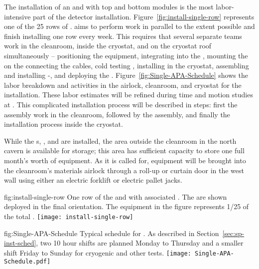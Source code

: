 The installation of an  and   with top and bottom  modules is the most labor-intensive part of the detector installation. Figure~\ref{fig:install-single-row} represents one of the 25 rows of .   aims to perform work in parallel to the extent possible and finish installing one row every week. 
This requires that several separate teams work in the cleanroom, inside the cryostat, and on the cryostat roof simultaneously --  positioning the equipment, integrating  into the , mounting the   on the  connecting the cables, cold testing , installing  in the cryostat, assembling and installing -, and deploying the .
Figure~\ref{fig:Single-APA-Schedule} shows the labor breakdown and activities in the airlock,  cleanroom, and cryostat for the  installation. These labor estimates will be refined during time and motion studies at . 
This complicated installation process will be described in steps: first the  assembly work in the cleanroom, followed by the  assembly, and finally the installation process inside the cryostat.

While the s, , and  are installed, the area outside the cleanroom in the north cavern is available for storage; this area has sufficient capacity to store one full month's worth of equipment. As it is called for, equipment will be brought into the cleanroom's materials airlock through a roll-up or curtain door in the west wall using either an electric forklift or electric pallet jacks.

\begin{dunefigure}{fig:install-single-row}
{One row of the  and  with associated . The  are shown deployed in the final orientation. The equipment in the figure represents 1/25 of the total .}
 \texttt{[image: install-single-row]}
\end{dunefigure}

\begin{dunefigure}
{fig:Single-APA-Schedule}
{Typical  schedule for . As described in Section~\ref{sec:sp-inst-sched}, %
two 10 hour shifts are planned Monday to Thursday and a smaller shift Friday to Sunday for cryogenic and other tests. }
\texttt{[image: Single-APA-Schedule.pdf]}
\end{dunefigure}


